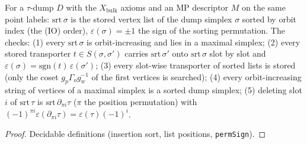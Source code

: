\begin{definition}\label{def:mp-ac-checks}
  \leanok
  For a $\tau$-dump $D$ with the $X_{\mathrm{bulk}}$ axioms and an MP descriptor $M$ on the same point labels: $\mathrm{srt}\,\sigma$ is
  the stored vertex list of the dump simplex $\sigma$ sorted by orbit index (the (IO) order), $\varepsilon(\sigma)=\pm1$ the sign of
  the sorting permutation.  The checks: (1) every $\mathrm{srt}\,\sigma$ is orbit-increasing and lies in a maximal simplex; (2) every
  stored transporter $t\in S(\sigma,\sigma')$ carries $\mathrm{srt}\,\sigma'$ onto $\mathrm{srt}\,\sigma$ slot by slot and
  $\varepsilon(\sigma)=\mathrm{sgn}(t)\,\varepsilon(\sigma')$; (3) every slot-wise transporter of sorted lists is stored (only the coset
  $g_p\Gamma_og_w^{-1}$ of the first vertices is searched); (4) every orbit-increasing string of vertices of a maximal simplex is a
  sorted dump simplex; (5) deleting slot $i$ of $\mathrm{srt}\,\tau$ is $\mathrm{srt}\,\partial_{\pi i}\tau$ ($\pi$ the position
  permutation) with $(-1)^{\pi i}\varepsilon(\partial_{\pi i}\tau)=\varepsilon(\tau)(-1)^i$.
\end{definition}
\begin{proof}
  \leanok
  Decidable definitions (insertion sort, list positions, \texttt{permSign}).
\end{proof}

